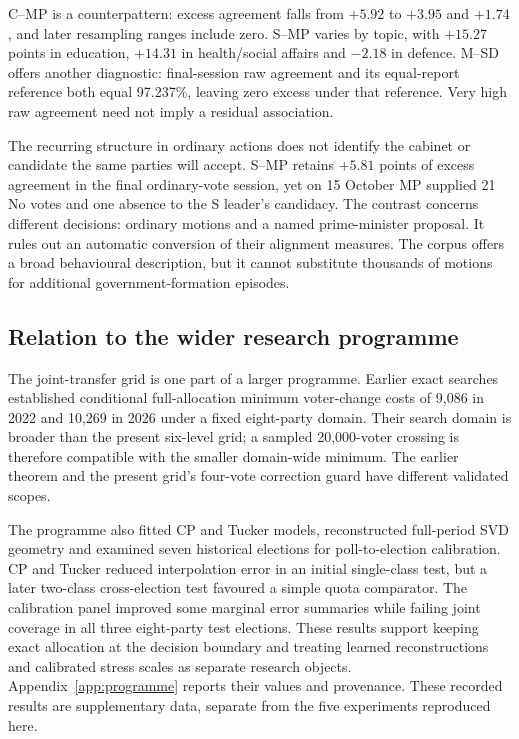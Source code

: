 \documentclass[11pt,a4paper]{article}
\begin{document}
C--MP is a counterpattern: excess agreement falls from \(+5.92\) to \(+3.95\) and \(+1.74\), and later resampling ranges include zero. S--MP varies by topic, with \(+15.27\) points in education, \(+14.31\) in health/social affairs and \(-2.18\) in defence. M--SD offers another diagnostic: final-session raw agreement and its equal-report reference both equal 97.237\%, leaving zero excess under that reference. Very high raw agreement need not imply a residual association.

The recurring structure in ordinary actions does not identify the cabinet or candidate the same parties will accept. S--MP retains \(+5.81\) points of excess agreement in the final ordinary-vote session, yet on 15 October MP supplied 21 No votes and one absence to the S leader's candidacy. The contrast concerns different decisions: ordinary motions and a named prime-minister proposal. It rules out an automatic conversion of their alignment measures. The corpus offers a broad behavioural description, but it cannot substitute thousands of motions for additional government-formation episodes.

\subsection{Relation to the wider research programme}

The joint-transfer grid is one part of a larger programme. Earlier exact searches established conditional full-allocation minimum voter-change costs of 9,086 in 2022 and 10,269 in 2026 under a fixed eight-party domain. Their search domain is broader than the present six-level grid; a sampled 20,000-voter crossing is therefore compatible with the smaller domain-wide minimum. The earlier theorem and the present grid's four-vote correction guard have different validated scopes.

The programme also fitted CP and Tucker models, reconstructed full-period SVD geometry and examined seven historical elections for poll-to-election calibration. CP and Tucker reduced interpolation error in an initial single-class test, but a later two-class cross-election test favoured a simple quota comparator. The calibration panel improved some marginal error summaries while failing joint coverage in all three eight-party test elections. These results support keeping exact allocation at the decision boundary and treating learned reconstructions and calibrated stress scales as separate research objects. Appendix~\ref{app:programme} reports their values and provenance. These recorded results are supplementary data, separate from the five experiments reproduced here.
\end{document}
